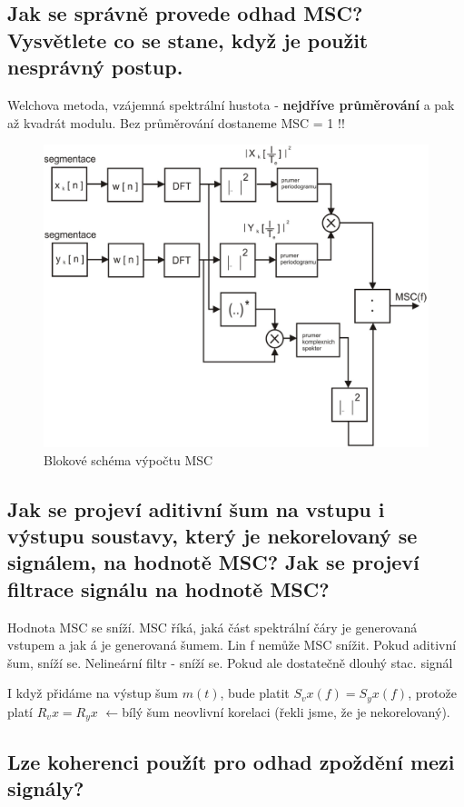 \documentclass[a4paper,12pt]{article}   %
\newcommand{\llarr}{$\leftarrow$}
\newcommand{\mt}[1]{$#1$}
\begin{document}
\subsection{Jak se správně provede odhad MSC? Vysvětlete co se stane, když je použit nesprávný postup.}

Welchova metoda, vzájemná spektrální hustota - \textbf{nejdříve průměrování} a pak až kvadrát modulu. Bez průměrování dostaneme MSC = 1 !!
\begin{figure}[h!]
        \centering
        \includegraphics[width=.7\textwidth]{fig/MSC_blokove_schema.png}
        \caption*{Blokové schéma výpočtu MSC}
\end{figure}
\FloatBarrier


\subsection{Jak se projeví aditivní šum na vstupu i výstupu soustavy, který je nekorelovaný se signálem, na hodnotě MSC? Jak se projeví filtrace signálu na hodnotě MSC?}

Hodnota MSC se sníží. MSC říká, jaká část spektrální čáry je generovaná vstupem a jak á je generovaná šumem. Lin f nemůže MSC snížit. Pokud aditivní šum, sníží se. Nelineární filtr - sníží se. Pokud ale dostatečně dlouhý stac. signál

I když přidáme na výstup šum \mt{m(t)}, bude platit \mt{S_vx(f) = S_yx(f)}, protože platí \mt{R_vx = R_yx} \llarr bílý šum neovlivní korelaci (řekli jsme, že je nekorelovaný). 


\subsection{Lze koherenci použít pro odhad zpoždění mezi signály?}
\end{document}
